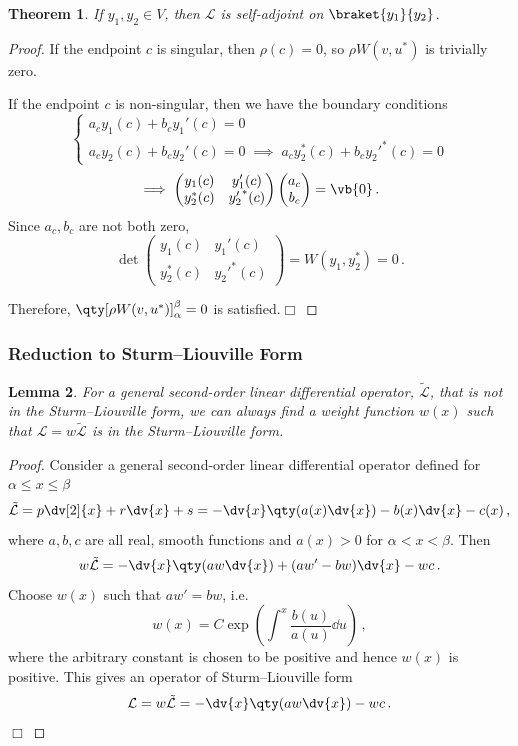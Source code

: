 \documentclass{article}
\theoremstyle{plain}\theoremheaderfont{\normalfont\itshape}\theorembodyfont{\rmfamily}\theoremseparator{.}\newtheorem*{rem}{Remark}\newtheorem*{ex}{Example}\newtheorem*{proof}{Proof}\newtheorem*{altp}{Alternative proof}
\theoremstyle{plain}\theoremheaderfont{\normalfont\bfseries}\theorembodyfont{\rmfamily}\theoremseparator{.}\newtheorem{thm}{Theorem}[section]\newtheorem{lem}[thm]{Lemma}\newtheorem{prop}[thm]{Proposition}\newtheorem*{cor}{Corollary}\newtheorem{defn}[thm]{Definition}\newtheorem{clm}[thm]{Claim}\newtheorem{clminproof}{Claim}
\theoremstyle{break}\theoremheaderfont{\normalfont\itshape}\theorembodyfont{\rmfamily}\theoremseparator{.\medskip}\newtheorem*{proofskip}{Proof}\newtheorem*{exs}{Examples}\newtheorem*{rems}{Remarks}
\theoremstyle{break}\theoremheaderfont{\normalfont\bfseries}\theorembodyfont{\rmfamily}\theoremseparator{.\medskip}\newtheorem{lemskip}[thm]{Lemma}\newtheorem{defnskip}[thm]{Definition}\newtheorem{propskip}[thm]{Proposition}\newtheorem{thmskip}[thm]{Theorem}
\numberwithin{equation}{section}
\newcommand{\qed}{\hfill\ensuremath{\Box}}
\begin{document}
	\begin{thm}
		If \(y_1,y_2\in V\), then \(\mathcal{L}\) is self-adjoint on \(\braket{y_1}{y_2}\).
	\end{thm}
	\begin{proof}
		If the endpoint \(c\) is singular, then \(\rho(c)=0\), so \(\rho W(v,u^*)\) is trivially zero.

		If the endpoint \(c\) is non-singular, then we have the boundary conditions
		\[\begin{cases}
			a_cy_1(c)+b_cy_1'(c)=0\\
			a_cy_2(c)+b_cy_2'(c)=0\; \implies\;a_cy_2^*(c)+b_c{y_2'}^*(c)=0
		\end{cases}\]
		\[\implies\begin{pmatrix}
			y_1(c) & y_1'(c)\\
			y_2^*(c) & {y_2'}^*(c)
		\end{pmatrix}\begin{pmatrix}
			a_c \\ b_c
		\end{pmatrix}=\vb{0}\,.\]
		Since \(a_c,b_c\) are not both zero,
		\[\det\begin{pmatrix}
			y_1(c) & y_1'(c)\\
			y_2^*(c) & {y_2'}^*(c)
		\end{pmatrix}=W(y_1,y_2^*)=0\,.\]

		Therefore, \(\qty[\rho W(v,u^*)]_{\alpha}^{\beta}=0\) is satisfied.\qed
	\end{proof}

	\subsubsection{Reduction to Sturm--Liouville Form}
	\begin{lem}
		For a general second-order linear differential operator, \(\tilde{\mathcal{L}}\), that is not in the Sturm--Liouville form, we can always find a weight function \(w(x)\) such that \(\mathcal{L}=w\tilde{\mathcal{L}}\) is in the Sturm--Liouville form.
	\end{lem}

	\begin{proof}
		Consider a general second-order linear differential operator defined for \(\alpha\le x\le\beta\)
		\[\tilde{\mathcal{L}}=p\dv[2]{x}+r\dv{x}+s=-\dv{x}\qty(a(x)\dv{x})-b(x)\dv{x}-c(x)\,,\]
		where \(a,b,c\) are all real, smooth functions and \(a(x)> 0\) for \(\alpha<x<\beta\). Then
		\[w\tilde{\mathcal{L}}=-\dv{x}\qty(aw\dv{x})+(aw'-bw)\dv{x}-wc\,.\]
		Choose \(w(x)\) such that \(aw'=bw\), i.e.
		\[w(x)=C\exp(\int^x \frac{b(u)}{a(u)}\dd{u})\,,\]
		where the arbitrary constant is chosen to be positive and hence \(w(x)\) is positive.
		This gives an operator of Sturm--Liouville form
		\[\mathcal{L}=w\tilde{\mathcal{L}}=-\dv{x}\qty(aw\dv{x})-wc\,.\]\qed
	\end{proof}
\end{document}
